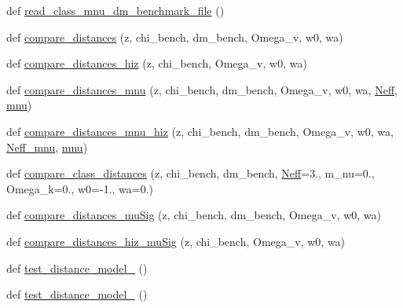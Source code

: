 \begin{DoxyCompactItemize}
\item 
def \mbox{\hyperlink{namespaceccl__test__distances_a3c41444e8d68b50c2d1465464e08b5e2}{read\+\_\+class\+\_\+mnu\+\_\+dm\+\_\+benchmark\+\_\+file}} ()
\item 
def \mbox{\hyperlink{namespaceccl__test__distances_ab82b4c6c6e09365fb75f5d938c256534}{compare\+\_\+distances}} (z, chi\+\_\+bench, dm\+\_\+bench, Omega\+\_\+v, w0, wa)
\item 
def \mbox{\hyperlink{namespaceccl__test__distances_a73d0450ebec8e25f65fb0c27498f7acd}{compare\+\_\+distances\+\_\+hiz}} (z, chi\+\_\+bench, Omega\+\_\+v, w0, wa)
\item 
def \mbox{\hyperlink{namespaceccl__test__distances_a0cce8b8b66ddb4e327b1905ca907bb59}{compare\+\_\+distances\+\_\+mnu}} (z, chi\+\_\+bench, dm\+\_\+bench, Omega\+\_\+v, w0, wa, \mbox{\hyperlink{namespaceccl__test__distances_a23a5c8a12ec37f9ca3d0dc89fe1ae297}{Neff}}, \mbox{\hyperlink{namespaceccl__test__distances_a8e0e0198ea990e29a05cea77a670f0ab}{mnu}})
\item 
def \mbox{\hyperlink{namespaceccl__test__distances_a31ef9701c1a38e122ac4d470345c8758}{compare\+\_\+distances\+\_\+mnu\+\_\+hiz}} (z, chi\+\_\+bench, dm\+\_\+bench, Omega\+\_\+v, w0, wa, \mbox{\hyperlink{namespaceccl__test__distances_ae8ad2b14dae691b68145cfe94510ef92}{Neff\+\_\+mnu}}, \mbox{\hyperlink{namespaceccl__test__distances_a8e0e0198ea990e29a05cea77a670f0ab}{mnu}})
\item 
def \mbox{\hyperlink{namespaceccl__test__distances_a2b5f40d54cab3c37be15ab14f8c855dc}{compare\+\_\+class\+\_\+distances}} (z, chi\+\_\+bench, dm\+\_\+bench, \mbox{\hyperlink{namespaceccl__test__distances_a23a5c8a12ec37f9ca3d0dc89fe1ae297}{Neff}}=3., m\+\_\+nu=0., Omega\+\_\+k=0., w0=-\/1., wa=0.)
\item 
def \mbox{\hyperlink{namespaceccl__test__distances_aff1f59a0cf4bbcf78ceb0a65b9281083}{compare\+\_\+distances\+\_\+mu\+Sig}} (z, chi\+\_\+bench, dm\+\_\+bench, Omega\+\_\+v, w0, wa)
\item 
def \mbox{\hyperlink{namespaceccl__test__distances_ac0434cb9a83997e0a4bdd1017129c566}{compare\+\_\+distances\+\_\+hiz\+\_\+mu\+Sig}} (z, chi\+\_\+bench, Omega\+\_\+v, w0, wa)
\item 
def \mbox{\hyperlink{namespaceccl__test__distances_a13cbfbd552ff63e9f8dfe18e1784c32a}{test\+\_\+distance\+\_\+model\+\_}} ()
\item 
def \mbox{\hyperlink{namespaceccl__test__distances_affeb4b77ce49c9c351e3f177bea871eb}{test\+\_\+distance\+\_\+model\+\_}} ()

\end{DoxyCompactItemize}
